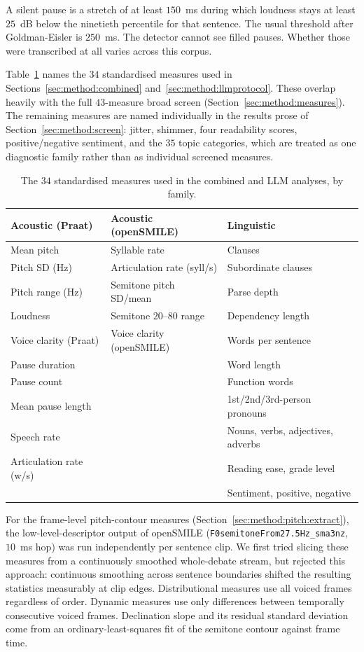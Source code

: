 \documentclass[pdflatex,sn-mathphys-num]{sn-jnl}%
\begin{document}
\begin{appendices}
A silent pause is a stretch of at least $150$~ms during which loudness stays
at least $25$~dB below the ninetieth percentile for that sentence. The usual
threshold after Goldman-Eisler \cite{goldman1968psycholinguistics} is
$250$~ms. The detector cannot see filled pauses. Whether those were
transcribed at all varies across this corpus.

Table~\ref{tab:featuredict} names the $34$ standardised measures used in
Sections~\ref{sec:method:combined} and~\ref{sec:method:llmprotocol}. These
overlap heavily with the full $43$-measure broad screen
(Section~\ref{sec:method:measures}). The remaining measures are named
individually in the results prose of Section~\ref{sec:method:screen}:
jitter, shimmer, four readability scores, positive/negative sentiment, and
the $35$ topic categories, which are treated as one diagnostic family
rather than as individual screened measures.

\begin{table}[h]
\caption{The $34$ standardised measures used in the combined and LLM
analyses, by family.}
\label{tab:featuredict}
\centering
\scriptsize
\setlength{\tabcolsep}{2pt}
\begin{tabular}{p{}p{}p{}}
\toprule
Acoustic (Praat) & Acoustic (openSMILE) & Linguistic \\
\midrule
Mean pitch & Syllable rate & Clauses \\
Pitch SD (Hz) & Articulation rate (syll/s) & Subordinate clauses \\
Pitch range (Hz) & Semitone pitch SD/mean & Parse depth \\
Loudness & Semitone $20$--$80$ range & Dependency length \\
Voice clarity (Praat) & Voice clarity (openSMILE) & Words per sentence \\
Pause duration & & Word length \\
Pause count & & Function words \\
Mean pause length & & 1st/2nd/3rd-person pronouns \\
Speech rate & & Nouns, verbs, adjectives, adverbs \\
Articulation rate (w/s) & & Reading ease, grade level \\
 & & Sentiment, positive, negative \\
\bottomrule
\end{tabular}
\end{table}

For the frame-level pitch-contour measures (Section~\ref{sec:method:pitch:extract}),
the low-level-descriptor output of openSMILE
(\texttt{F0semitoneFrom27.5Hz\_sma3nz}, $10$~ms hop) was run independently
per sentence clip. We first tried slicing these measures from a
continuously smoothed whole-debate stream, but rejected this approach:
continuous smoothing across sentence boundaries shifted the resulting
statistics measurably at clip edges. Distributional measures use all
voiced frames regardless of order. Dynamic measures use only differences
between temporally consecutive voiced frames. Declination slope and its
residual standard deviation come from an ordinary-least-squares fit of the
semitone contour against frame time.


\end{appendices}
\end{document}
